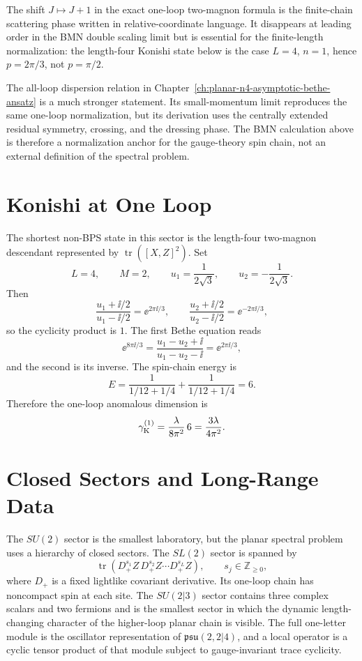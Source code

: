 The shift \(J\mapsto J+1\) in the exact one-loop two-magnon formula is the
finite-chain scattering phase written in relative-coordinate language.  It
disappears at leading order in the BMN double scaling limit but is essential
for the finite-length normalization: the length-four Konishi state below is
the case \(L=4\), \(n=1\), hence \(p=2\pi/3\), not \(p=\pi/2\).

The all-loop dispersion relation in
Chapter~\ref{ch:planar-n4-asymptotic-bethe-ansatz} is a much stronger
statement.  Its small-momentum limit reproduces the same one-loop
normalization, but its derivation uses the centrally extended residual
symmetry, crossing, and the dressing phase.  The BMN calculation above is
therefore a normalization anchor for the gauge-theory spin chain, not an
external definition of the spectral problem.

\section{Konishi at One Loop}

The shortest non-BPS state in this sector is the length-four two-magnon
descendant represented by \(\operatorname{tr}([X,Z]^2)\).  Set
\[
  L=4,\qquad M=2,\qquad
  u_1=\frac{1}{2\sqrt3},\qquad u_2=-\frac{1}{2\sqrt3}.
\]
Then
\[
  \frac{u_1+\ii/2}{u_1-\ii/2}=\ee^{2\pi\ii/3},
  \qquad
  \frac{u_2+\ii/2}{u_2-\ii/2}=\ee^{-2\pi\ii/3},
\]
so the cyclicity product is \(1\).  The first Bethe equation reads
\[
  \ee^{8\pi\ii/3}
  =
  \frac{u_1-u_2+\ii}{u_1-u_2-\ii}
  =
  \ee^{2\pi\ii/3},
\]
and the second is its inverse.  The spin-chain energy is
\[
  E=\frac{1}{1/12+1/4}+\frac{1}{1/12+1/4}=6 .
\]
Therefore the one-loop anomalous dimension is
\[
  \gamma_{\rm K}^{(1)}
  =
  \frac{\lambda}{8\pi^2}\,6
  =
  \frac{3\lambda}{4\pi^2}.
\]

\section{Closed Sectors and Long-Range Data}

The \(SU(2)\) sector is the smallest laboratory, but the planar spectral
problem uses a hierarchy of closed sectors.  The \(SL(2)\) sector is spanned
by
\[
  \operatorname{tr}(D_+^{s_1}Z\,D_+^{s_2}Z\cdots D_+^{s_L}Z),
  \qquad s_j\in\mathbb Z_{\geq0},
\]
where \(D_+\) is a fixed lightlike covariant derivative.  Its one-loop chain
has noncompact spin at each site.  The \(SU(2|3)\) sector contains three
complex scalars and two fermions and is the smallest sector in which the
dynamic length-changing character of the higher-loop planar chain is visible.
The full one-letter module is the oscillator representation of
\(\mathfrak{psu}(2,2|4)\), and a local operator is a cyclic tensor product of
that module subject to gauge-invariant trace cyclicity.

